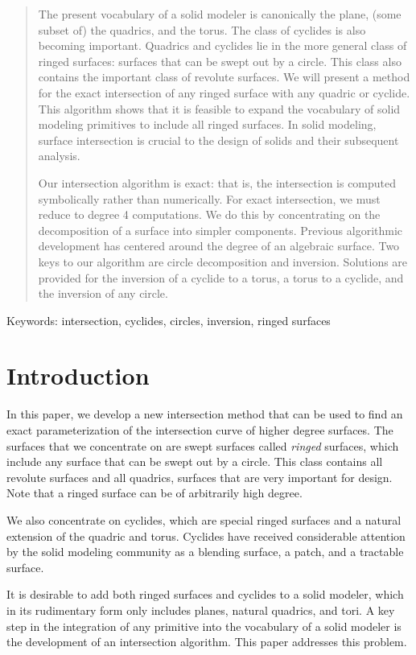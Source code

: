 \begin{abstract}
The present vocabulary of a solid modeler is canonically the plane,
(some subset of) the quadrics, and the torus.
The class of cyclides is also becoming important.
Quadrics and cyclides lie in the more general class of ringed surfaces:
surfaces that can be swept out by a circle.
This class also contains the important class of revolute surfaces.
We will present a method for the exact intersection of any ringed surface with
any quadric or cyclide.
This algorithm shows that it is feasible to expand the 
vocabulary of solid modeling primitives to include all ringed surfaces.
In solid modeling, surface intersection is crucial to the design of solids
and their subsequent analysis.

Our intersection algorithm is exact: 
that is, the intersection is computed symbolically rather than numerically.
For exact intersection, we must reduce to degree 4 computations.
We do this by concentrating on the decomposition of a surface into simpler
components.
Previous algorithmic development has centered around 
the degree of an algebraic surface.
Two keys to our algorithm are circle decomposition and inversion.
Solutions are provided for the inversion of a cyclide to a torus, a torus
to a cyclide, and the inversion of any circle.
\end{abstract}

Keywords: intersection, cyclides, circles, inversion, ringed surfaces

\section{Introduction}

In this paper, we develop a new intersection method that can be used
to find an exact parameterization of the intersection curve of higher
degree surfaces.
The surfaces that we concentrate on are swept surfaces called {\em ringed}
surfaces, which include any surface that can be swept out by a circle.
This class contains all revolute surfaces and all quadrics, surfaces that
are very important for design.
Note that a ringed surface can be of arbitrarily high degree.

We also concentrate on cyclides, which are special ringed surfaces 
and a natural extension of the quadric and torus.
Cyclides have received considerable attention by the solid modeling
community as a blending surface, a patch, and a tractable surface.

It is desirable to add both ringed surfaces and cyclides to a solid modeler,
which in its rudimentary form only includes planes, natural quadrics, and tori.
A key step in the integration of any primitive into the vocabulary of a solid
modeler is the development of an intersection algorithm.
This paper addresses this problem.

